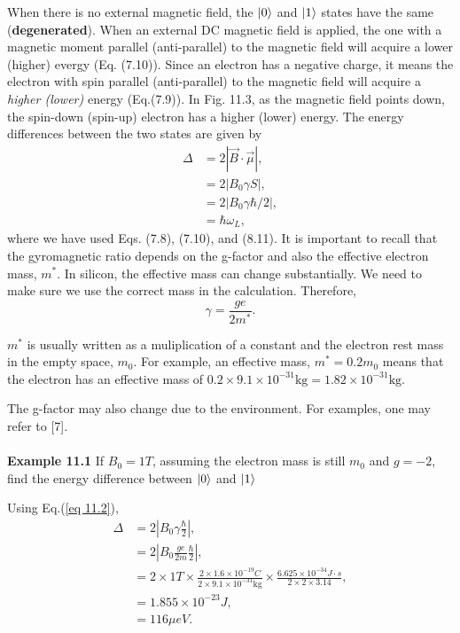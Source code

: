 \documentclass{article}
\begin{document}
When there is no external magnetic field, the $\ket{0}$ and $\ket{1}$ states have the same
(\textbf{degenerated}). When an external DC magnetic field is applied, the one with a 
magnetic moment parallel (anti-parallel) to the magnetic field will acquire a  lower
(higher) evergy (Eq. (7.10)). Since an electron has a negative charge, it means 
the electron with spin parallel (anti-parallel) to the magnetic field will acquire a
\textit{higher (lower)} energy (Eq.(7.9)). In Fig. 11.3, as the magnetic field points down,
the spin-down (spin-up) electron has a higher (lower) energy. The energy differences
between the two states are given by
\begin{align*}\label{eq 11.2}
    \varDelta&=2|\vec{B}\cdot\vec{\mu}|,\\
    &=2|B_0\gamma S|,\\
    &=2|B_0\gamma\hbar/2|,\\
    &=\hbar\omega_L,\tag{11.2}
\end{align*}
where we have used Eqs. (7.8), (7.10), and (8.11). It is important to recall that the gyromagnetic
ratio depends on the g-factor and also the effective electron mass, $m^*$.
In silicon, the effective mass can change substantially. We need to make sure we use
the correct mass in the calculation. Therefore,
\begin{equation}\label{eq 11.3}
    \gamma=\frac{ge}{2m^*}. \tag{11.3}
\end{equation}

$m^*$ is usually written as a muliplication of a constant and the electron rest mass in the
empty space, $m_0$. For example, an effective mass, $m^*=0.2m_0$ means that the electron has an
effective mass of $0.2\times9.1\times10^{-31}\text{kg}=1.82\times10^{-31}\text{kg}$.

The g-factor may also change due to the environment. For examples, one may refer to [7].\\\\
\textbf{Example 11.1} If $B_0=1T$, assuming the electron mass is still $m_0$ and $g=-2$, find the
energy difference between $\ket{0}$ and $\ket{1}$

Using Eq.(\ref{eq 11.2}),
\begin{align*}
    \varDelta&=2|B_0\gamma\frac{\hbar}{2}|,\\
    &=2|B_0\frac{ge}{2m}\frac{\hbar}{2}|,\\
    &=2\times1T\times\frac{2\times1.6\times10^{-19}C}{2\times9.1\times10^{-31}\text{kg}}\times
    \frac{6.625\times10^{-34}J\cdot s}{2\times2\times3.14},\\
    &=1.855\times10^{-23}J,\\
    &=116\mu eV.
\end{align*}
\end{document}
